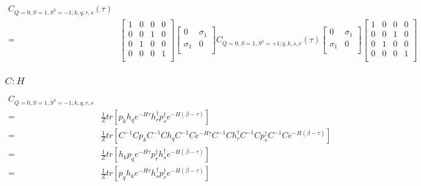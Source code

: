 \begin{equation*}
  \begin{aligned}
    C_{Q=0,S=1,S^3=-1;k,q,r,s} (\tau) \\
    =& \left[ {\begin{array}{cccc}
      1 & 0 & 0 & 0 \\
      0 & 0 & 1 & 0 \\
      0 & 1 & 0 & 0 \\
      0 & 0 & 0 & 1 \\
    \end{array} } \right]
    \left[ {\begin{array}{cc}
      0 & \sigma_1 \\
      \sigma_1 & 0 \\
    \end{array} } \right]
    C_{Q=0,S=1,S^3=+1;q,k,s,r} (\tau)
    \left[ {\begin{array}{cc}
      0 & \sigma_1 \\
      \sigma_1 & 0 \\
    \end{array} } \right]
    \left[ {\begin{array}{cccc}
      1 & 0 & 0 & 0 \\
      0 & 0 & 1 & 0 \\
      0 & 1 & 0 & 0 \\
      0 & 0 & 0 & 1 \\
    \end{array} } \right]
  \end{aligned}
\end{equation*}

\subsubsection{\underline{$C : H$}}

\begin{equation*}
  \begin{aligned}
    C_{Q=0,S=1,S^3=-1;k,q,r,s} \\
    =& \frac{1}{Z}tr\left[p_kh_qe^{-H\tau}h^\dagger_rp^\dagger_se^{-H\left(\beta-\tau\right)}\right] \\
    =& \frac{1}{Z}tr\left[C^{-1}Cp_kC^{-1}Ch_qC^{-1}Ce^{-H\tau}C^{-1}Ch^\dagger_rC^{-1}Cp^\dagger_sC^{-1}Ce^{-H\left(\beta-\tau\right)}\right] \\
    =& \frac{1}{Z}tr\left[h_kp_qe^{-H\tau}p^\dagger_rh^\dagger_se^{-H\left(\beta-\tau\right)}\right] \\
    =& \frac{1}{Z}tr\left[p_qh_ke^{-H\tau}h^\dagger_sp^\dagger_re^{-H\left(\beta-\tau\right)}\right]
  \end{aligned}
\end{equation*}


